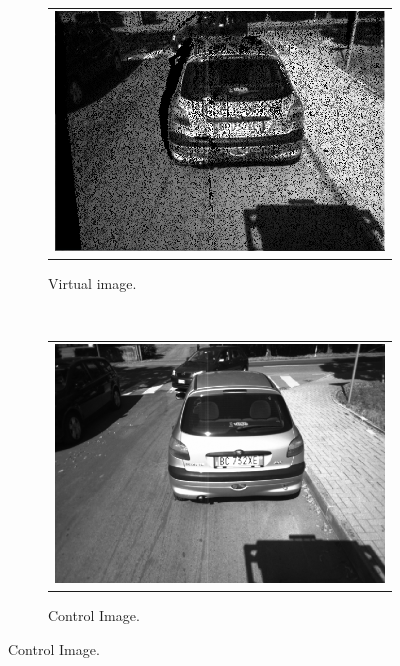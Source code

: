 \begin{figure}[h!]
        \centering
        \begin{subfigure}[b]{0.3\textwidth}
	  \begin{tabular}{c}
	    \includegraphics[width=\textwidth]{reprojection}
	  \end{tabular}
	  \caption{Virtual image.}\label{fig:cp03_ncc_virtual_img}
        \end{subfigure}%
        ~
        \begin{subfigure}[b]{0.3\textwidth}
	  \begin{tabular}{c}
	    \includegraphics[width=\textwidth]{leftNCC}
	  \end{tabular}
	  \caption{Control Image.}\label{fig:cp03_ncc_control_img}
        \end{subfigure}%

\end{figure}
